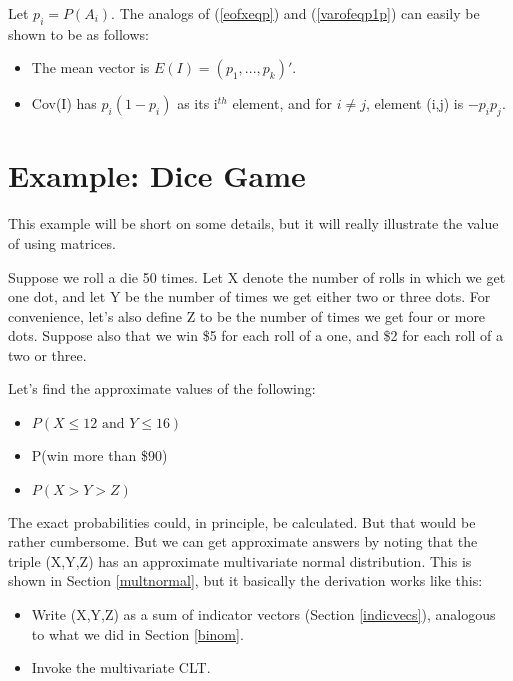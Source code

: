 Let $p_i = P(A_i)$.  The analogs of (\ref{eofxeqp}) and
(\ref{varofeqp1p}) can easily be shown to be as follows:

\begin{itemize}

\item The mean vector is $E(I) = (p_1,...,p_k)'$.

\item Cov(I) has $p_i(1-p_i)$ as its i$^{th}$ element, and for 
$i \neq j$, element (i,j) is $-p_i p_j$.

\end{itemize}

\section{Example:  Dice Game}
\label{dicegame}

This example will be short on some details, but it will really
illustrate the value of using matrices.

Suppose we roll a die 50 times.  Let X denote the number of rolls in
which we get one dot, and let Y be the number of times we get either two
or three dots.  For convenience, let's also define Z to be the number of
times we get four or more dots.  Suppose also that we win \$5 for each
roll of a one, and \$2 for each roll of a two or three. 

Let's find the approximate values of the following:

\begin{itemize}

\item $P(X \leq 12 \textrm{ and } Y \leq 16)$

\item P(win more than \$90)

\item $P(X > Y > Z)$

\end{itemize}

The exact probabilities could, in principle, be calculated.  But that
would be rather cumbersome.  But we can get approximate answers by
noting that the triple (X,Y,Z) has an approximate multivariate normal
distribution.  This is shown in Section \ref{multnormal}, but it
basically the derivation works like this:

\begin{itemize}

\item Write (X,Y,Z) as a sum of indicator vectors (Section
\ref{indicvecs}), analogous to what we did in Section \ref{binom}.

\item Invoke the multivariate CLT.

\end{itemize}

